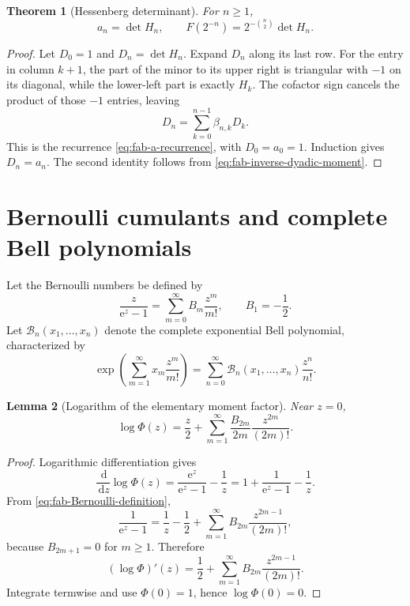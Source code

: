 \documentclass[11pt,oneside,openany]{book}
\newtheorem{theorem}{Theorem}[chapter]
\newtheorem{lemma}[theorem]{Lemma}
\theoremstyle{definition}
\theoremstyle{remark}
\newcommand{\e}{\mathrm e}
\newcommand{\dd}{\,\mathrm d}
\begin{document}
\begin{theorem}[Hessenberg determinant]
\label{thm:fab-Hessenberg}
For $n\ge1$,
\begin{equation}
 a_n=\det H_n,
 \qquad
 F(2^{-n})=2^{-\binom n2}\det H_n.
 \label{eq:fab-Hessenberg}
\end{equation}
\end{theorem}

\begin{proof}
Let $D_0=1$ and $D_n=\det H_n$.  Expand $D_n$ along its last row.  For the
entry in column $k+1$, the part of the minor to its upper right is triangular
with $-1$ on its diagonal, while the lower-left part is exactly $H_k$.
The cofactor sign cancels the product of those $-1$ entries, leaving
\[
 D_n=\sum_{k=0}^{n-1}\beta_{n,k}D_k.
\]
This is the recurrence \eqref{eq:fab-a-recurrence}, with $D_0=a_0=1$.
Induction gives $D_n=a_n$.  The second identity follows from
\eqref{eq:fab-inverse-dyadic-moment}.
\end{proof}

\section{Bernoulli cumulants and complete Bell polynomials}

Let the Bernoulli numbers be defined by
\begin{equation}
 \frac{z}{\e^z-1}=\sum_{m=0}^{\infty}B_m\frac{z^m}{m!},
 \qquad B_1=-\frac12.
 \label{eq:fab-Bernoulli-definition}
\end{equation}
Let $\mathcal B_n(x_1,\ldots,x_n)$ denote the complete exponential Bell
polynomial, characterized by
\begin{equation}
 \exp\!\left(\sum_{m=1}^{\infty}x_m\frac{z^m}{m!}\right)
 =\sum_{n=0}^{\infty}\mathcal B_n(x_1,\ldots,x_n)\frac{z^n}{n!}.
 \label{eq:fab-Bell-definition}
\end{equation}

\begin{lemma}[Logarithm of the elementary moment factor]
\label{lem:fab-log-Phi}
Near $z=0$,
\begin{equation}
 \log\Phi(z)=\frac z2+
 \sum_{m=1}^{\infty}
 \frac{B_{2m}}{2m}\frac{z^{2m}}{(2m)!}.
 \label{eq:fab-log-Phi}
\end{equation}
\end{lemma}

\begin{proof}
Logarithmic differentiation gives
\[
 \frac{\dd}{\dd z}\log\Phi(z)
 =\frac{\e^z}{\e^z-1}-\frac1z
 =1+\frac1{\e^z-1}-\frac1z.
\]
From \eqref{eq:fab-Bernoulli-definition},
\[
 \frac1{\e^z-1}=\frac1z-\frac12+
 \sum_{m=1}^{\infty}B_{2m}\frac{z^{2m-1}}{(2m)!},
\]
because $B_{2m+1}=0$ for $m\ge1$.  Therefore
\[
 (\log\Phi)'(z)=\frac12+
 \sum_{m=1}^{\infty}B_{2m}\frac{z^{2m-1}}{(2m)!}.
\]
Integrate termwise and use $\Phi(0)=1$, hence $\log\Phi(0)=0$.
\end{proof}
\end{document}
